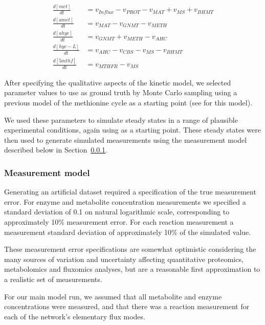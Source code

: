 \documentclass[journal=asbcd6,manuscript=article,layout=traditional]{achemso}
\begin{document}
\begin{align}
\frac{d[met]}{dt} &= v_{Influx} - v_{PROT} - v_{MAT} +v_{MS} + v_{BHMT} \label{eq-meth-ode} \\
\frac{d[amet]}{dt} &= v_{MAT} - v_{GNMT} - v_{METH} \nonumber \\
\frac{d[ahyc]}{dt} &= v_{GNMT} + v_{METH} - v_{AHC} \nonumber \\
\frac{d[hyc-L]}{dt} &= v_{AHC} - v_{CBS} - v_{MS} - v_{BHMT} \nonumber \\
\frac{d[5mthf]}{dt} &= v_{MTHFR} - v_{MS} \nonumber 
\end{align}

After specifying the qualitative aspects of the kinetic model, we
selected parameter values to use as ground truth by Monte Carlo sampling
using a previous model of the methionine cycle as a starting point (see
\citet{saa_construction_2016} for this model).

We used these parameters to simulate steady states in a range of
plausible experimental conditions, again using
\citet{saa_construction_2016} as a starting point. These steady states
were then used to generate simulated measurements using the measurement
model described below in Section~\ref{sec-methionine-measurement-model}.

\hypertarget{sec-methionine-measurement-model}{%
\subsubsection{Measurement
model}\label{sec-methionine-measurement-model}}

Generating an artificial dataset required a specification of the true
measurement error. For enzyme and metabolite concentration measurements
we specified a standard deviation of 0.1 on natural logarithmic scale,
corresponding to approximately 10\% measurement error. For each reaction
measurement a measurement standard deviation of approximately 10\% of
the simulated value.

These measurement error specifications are somewhat optimistic
considering the many sources of variation and uncertainty affecting
quantitative proteomics, metabolomics and fluxomics analyses, but are a
reasonable first approximation to a realistic set of measurements.

For our main model run, we assumed that all metabolite and enzyme
concentrations were measured, and that there was a reaction measurement
for each of the network's elementary flux modes.
\end{document}
